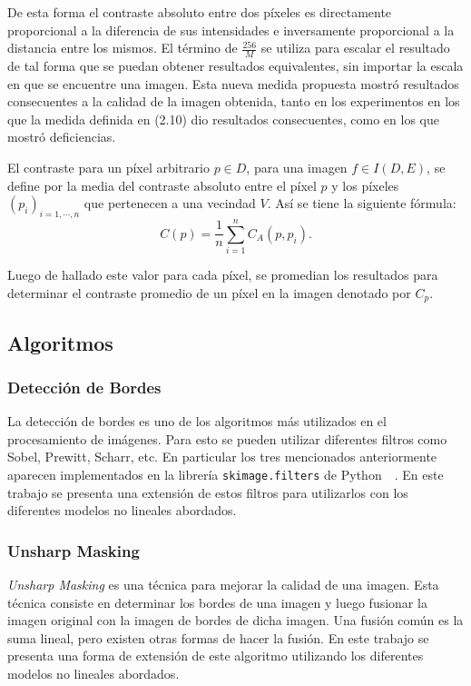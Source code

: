 De esta forma el contraste absoluto entre dos p\'ixeles es directamente proporcional a la diferencia de sus intensidades e inversamente proporcional a la distancia entre los mismos. El t\'ermino de $\frac{256}{M}$ se utiliza para escalar el resultado de tal forma que se puedan obtener resultados equivalentes, sin importar la escala en que se encuentre una imagen. Esta nueva medida propuesta mostr\'o resultados consecuentes a la calidad de la imagen obtenida, tanto en los experimentos en los que la medida definida en (2.10) dio resultados consecuentes, como en los que mostr\'o deficiencias.

El contraste para un píxel arbitrario $p \in D$, para una imagen $f \in I ( D , E )$, se define por la media del contraste absoluto entre el píxel $p$ y los píxeles $( p_i )_{i = 1,\cdots,n}$ que pertenecen a una vecindad $V$. Así se tiene la siguiente fórmula:
\begin{equation}
	\displaystyle C(p)=\frac{1}{n}\sum_{i=1}^{n}C_A(p,p_i).
\end{equation}

Luego de hallado este valor para cada p\'ixel, se promedian los resultados para determinar el contraste promedio de un p\'ixel en la imagen denotado por $C_p$.

\subsection{Algoritmos}

\subsubsection{Detecci\'on de Bordes}

La detecci\'on de bordes es uno de los algoritmos m\'as utilizados en el procesamiento de im\'agenes. Para esto se pueden utilizar diferentes filtros como Sobel, Prewitt, Scharr, etc. En particular los tres mencionados anteriormente aparecen implementados en la librer\'ia \verb|skimage.filters| de Python~\cite{module_filters}~\cite{scikit-image}. En este trabajo se presenta una extensi\'on de estos filtros para utilizarlos con los diferentes modelos no lineales abordados. 

\subsubsection{Unsharp Masking}

\textit{Unsharp Masking} es una t\'ecnica para mejorar la calidad de una imagen. Esta t\'ecnica consiste en determinar los bordes de una imagen y luego fusionar la imagen original con la imagen de bordes de dicha imagen. Una fusi\'on com\'un es la suma lineal, pero existen otras formas de hacer la fusi\'on. En este trabajo se presenta una forma de extensi\'on de este algoritmo utilizando los diferentes modelos no lineales abordados.

